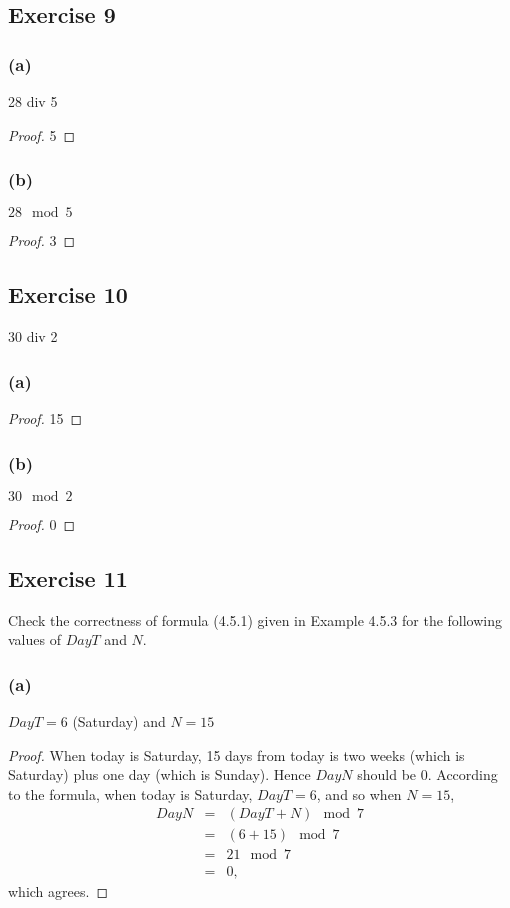 \documentclass[14pt]{extarticle}
\begin{document}
\subsection{Exercise 9}

\subsubsection{(a)}
28 div 5

\begin{proof}
    5
\end{proof}

\subsubsection{(b)}
$28 \mod 5$

\begin{proof}
    3
\end{proof}

\subsection{Exercise 10}
30 div 2

\subsubsection{(a)}

\begin{proof}
    15
\end{proof}

\subsubsection{(b)}
$30 \mod 2$

\begin{proof}
    0
\end{proof}

\subsection{Exercise 11}
Check the correctness of formula (4.5.1) given in Example 4.5.3 for the following values of $DayT$ and $N$.

\subsubsection{(a)}
$DayT = 6$ (Saturday) and $N = 15$

\begin{proof}
    When today is Saturday, 15 days from today is two weeks (which is Saturday) plus one day (which is Sunday). Hence $DayN$ should be 0. According to the formula, when today is Saturday, $DayT = 6$, and so when $N = 15$,
    \[
        \begin{array}{rcl}
            DayN & = & (DayT + N) \mod 7 \\
                 & = & (6 + 15) \mod 7   \\
                 & = & 21 \mod 7         \\
                 & = & 0,
        \end{array}
    \]
    which agrees.
\end{proof}
\end{document}
